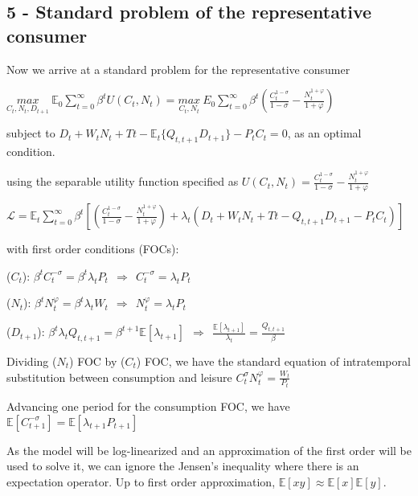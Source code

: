 \documentclass[
]{article}
\begin{document}
\hypertarget{standard-problem-of-the-representative-consumer}{%
\subsection{5 - Standard problem of the representative
consumer}\label{standard-problem-of-the-representative-consumer}}

Now we arrive at a standard problem for the representative consumer

\(\displaystyle \underset{C_t,N_t,D_{t+1}} {max} \ \mathbb{E}_0 \sum_{t=0}^\infty \beta^t U(C_t,N_t) = \displaystyle \underset{C_t,N_t} {max} \ E_0 \sum_{t=0}^\infty \beta^t \left( \frac{C_t^{1-\sigma}}{1-\sigma}-\frac{N_t^{1+\varphi}}{1+\varphi} \right)\)

subject to
\(\displaystyle D_t + W_tN_t + Tt - \mathbb{E}_t\{ Q_{t,t+1}D_{t+1}\} - P_t C_t = 0\),
as an optimal condition.

using the separable utility function specified as
\(\displaystyle U(C_t,N_t)=\frac{C_t^{1-\sigma}}{1-\sigma}-\frac{N_t^{1+\varphi}}{1+\varphi}\)

\(\mathcal{L} = \displaystyle \mathbb{E}_t \sum_{t=0}^\infty \beta^t \left[ \left( \frac{C_t^{1-\sigma}}{1-\sigma}-\frac{N_t^{1+\varphi}}{1+\varphi} \right) + \lambda_t \left( D_t + W_tN_t + Tt - Q_{t,t+1}D_{t+1} - P_t C_t \right) \right]\)

with first order conditions (FOCs):

(\(C_t\)):
\(\displaystyle \beta^tC_t^{-\sigma} = \beta^t \lambda_t P_t \ \ \Rightarrow \ \ C_t^{-\sigma} = \lambda_t P_t\)

(\(N_t\)):
\(\displaystyle \beta^tN_t^{\varphi} = \beta^t \lambda_t W_t \ \ \Rightarrow \ \ N_t^{\varphi} = \lambda_t P_t\)

(\(D_{t+1}\)):
\(\displaystyle \beta^t \lambda_t Q_{t,t+1} = \beta^{t+1} \mathbb {E}[\lambda_{t+1}] \ \ \Rightarrow \ \ \frac{\mathbb{E}[\lambda_{t+1}]}{\lambda_t} = \frac{Q_{t,t+1}}{\beta}\)

Dividing (\(N_t\)) FOC by (\(C_t\)) FOC, we have the standard equation
of intratemporal substitution between consumption and leisure
\(\displaystyle C_t^{\sigma}N_t^{\varphi} = \frac{W_t}{P_t}\)

Advancing one period for the consumption FOC, we have
\(\mathbb{E} [C_{t+1}^{-\sigma}] = \mathbb{E}[\lambda_{t+1}P_{t+1}]\)

As the model will be log-linearized and an approximation of the first
order will be used to solve it, we can ignore the Jensen's inequality
where there is an expectation operator. Up to first order approximation,
\(\mathbb{E}[xy] \approx \mathbb{E}[x] \mathbb{E}[y]\).
\end{document}
